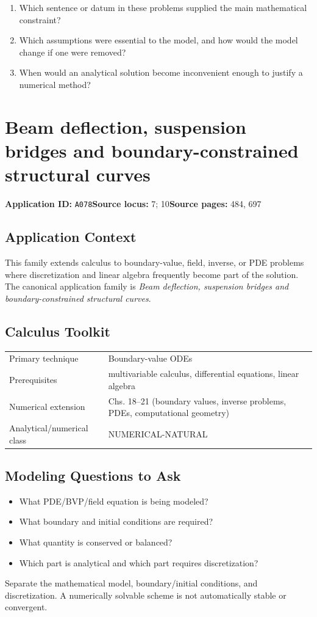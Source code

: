\documentclass[11pt]{book}
\newcommand{\pid}[1]{\texttt{#1}}
\begin{document}
\begin{reflectionbox}\begin{enumerate}
\item Which sentence or datum in these problems supplied the main mathematical constraint?
\item Which assumptions were essential to the model, and how would the model change if one were removed?
\item When would an analytical solution become inconvenient enough to justify a numerical method?
\end{enumerate}\end{reflectionbox}
\chapter{Beam deflection, suspension bridges and boundary-constrained structural curves}\label{app:A078}
\textbf{Application ID:} \pid{A078}\quad \textbf{Source locus:} 7; 10\quad \textbf{Source pages:} 484, 697
\section*{Application Context}
This family extends calculus to boundary-value, field, inverse, or PDE problems where discretization and linear algebra frequently become part of the solution. The canonical application family is \emph{Beam deflection, suspension bridges and boundary-constrained structural curves}.
\section*{Calculus Toolkit}
\begin{tabularx}{\textwidth}{@{}lX@{}}\toprule
Primary technique & Boundary-value ODEs \\
Prerequisites & multivariable calculus, differential equations, linear algebra \\
Numerical extension & Chs. 18–21 (boundary values, inverse problems, PDEs, computational geometry) \\
Analytical/numerical class & NUMERICAL-NATURAL \\
\bottomrule\end{tabularx}
\section*{Modeling Questions to Ask}\begin{itemize}
\item What PDE/BVP/field equation is being modeled?
\item What boundary and initial conditions are required?
\item What quantity is conserved or balanced?
\item Which part is analytical and which part requires discretization?
\end{itemize}
\begin{errorbox}Separate the mathematical model, boundary/initial conditions, and discretization. A numerically solvable scheme is not automatically stable or convergent.\end{errorbox}
\end{document}
